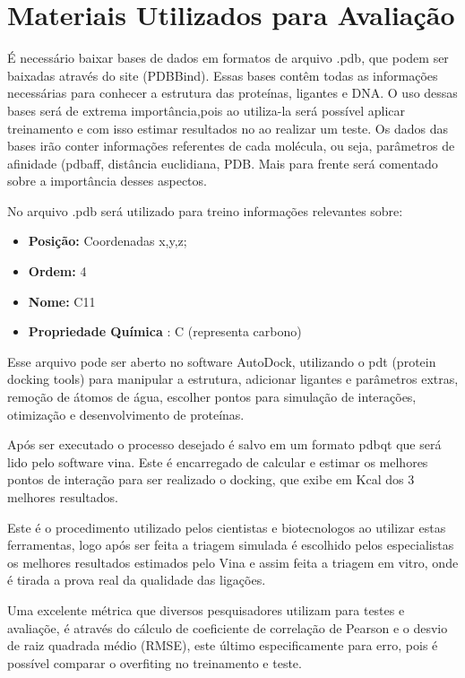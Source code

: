 \documentclass[tcc, capa]{texucpel}
\begin{document}
\section{Materiais Utilizados para Avaliação}
É necessário baixar bases de dados em formatos de arquivo .pdb, que podem ser baixadas através do site (PDBBind). Essas bases contêm todas as informações necessárias para conhecer a estrutura das proteínas, ligantes e DNA. 
O uso dessas bases será de extrema importância,pois ao utiliza-la será possível aplicar treinamento e com isso estimar resultados no ao realizar um teste. 
Os dados das bases irão conter informações referentes de cada molécula, ou seja, parâmetros de afinidade (pdbaff, distância euclidiana, PDB. Mais para frente será comentado sobre a importância desses aspectos.

No arquivo .pdb será utilizado para treino informações relevantes sobre: 
\begin{itemize}

\item \textbf{Posição:} Coordenadas x,y,z;
\item \textbf{Ordem:} 4
\item \textbf{Nome:} C11
\item \textbf{Propriedade Química} : C (representa carbono)

\end{itemize}

Esse arquivo pode ser aberto no software AutoDock, utilizando o pdt (protein docking tools) para manipular a estrutura, adicionar ligantes e parâmetros extras, remoção de átomos de água, escolher pontos para simulação de interações, otimização e desenvolvimento de proteínas. 

Após ser executado o processo desejado é salvo em um formato pdbqt que será lido pelo software vina. Este é encarregado de calcular e estimar os melhores pontos de interação para ser realizado o docking, que exibe em Kcal dos 3 melhores resultados.

Este é o procedimento utilizado pelos cientistas e biotecnologos ao utilizar estas ferramentas, logo após ser feita a triagem simulada é escolhido pelos especialistas os melhores resultados estimados pelo Vina e assim feita a triagem em vitro, onde é tirada a prova real da qualidade das ligações.

Uma excelente métrica que diversos pesquisadores utilizam para testes e avaliaçõe, é através do cálculo de coeficiente de correlação de Pearson e o desvio de raiz quadrada médio (RMSE), este último especificamente para erro, pois é possível comparar o overfiting no treinamento e teste.
\end{document}
